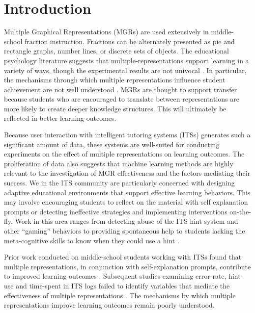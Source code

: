 \documentclass{edm_template}
\begin{document}

\section{Introduction}
\label{sec:introduction}

Multiple Graphical Representations (MGRs) are used extensively in middle-school fraction instruction.  Fractions can be alternately presented as pie and rectangle graphs, number lines, or discrete sets of objects. The educational psychology literature suggests that multiple-representations support learning in a variety of ways, though the experimental results are not univocal \cite{Ainsworth1999}. In particular, the mechanisms through which multiple representations influence student achievement are not well understood \cite{Ainsworth2006}. MGRs are thought to support transfer because students who are encouraged to translate between representations are more likely to create deeper knowledge structures. This will ultimately be reflected in better learning outcomes.

Because user interaction with intelligent tutoring systems (ITSs) generates such a significant amount of data, these systems are well-suited for conducting experiments on the effect of multiple representations on learning outcomes. The proliferation of data also suggests that machine learning methods are highly relevant to the investigation of MGR effectiveness and the factors mediating their success. We in the ITS community are particularly concerned with designing adaptive educational environments that support effective learning behaviors. This may involve encouraging students to reflect on the material with self explanation prompts \cite{Rau2009} or detecting ineffective strategies and implementing interventions on-the-fly. Work in this area ranges from detecting abuse of the ITS hint system and other ``gaming'' behaviors \cite{Baker2009} to providing spontaneous help to students lacking the meta-cognitive skills to know when they could use a hint \cite{Aleven2006}.

Prior work conducted on middle-school students working with ITSs found that multiple representations, in conjunction with self-explanation prompts, contribute to improved learning outcomes \cite{Rau2009}. Subsequent studies examining error-rate, hint-use and time-spent in ITS logs failed to identify variables that mediate the effectiveness of multiple representations \cite{Rau2012}. The mechanisms by which multiple representations improve learning outcomes remain poorly understood.
\end{document}
